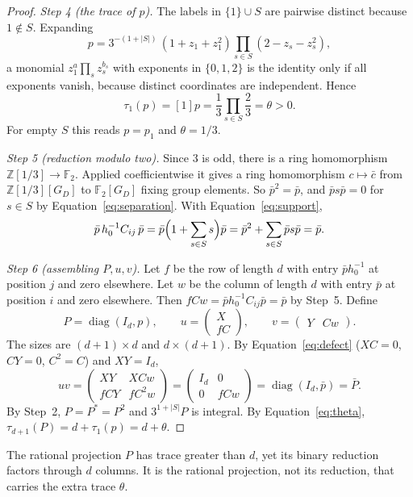 \documentclass[11pt]{article}
\theoremstyle{remark}
\numberwithin{equation}{section}
\newcommand{\F}{\mathbb F}
\newcommand{\Z}{\mathbb Z}
\newcommand{\diag}{\operatorname{diag}}
\begin{document}
\begin{proof}
\emph{Step 4 (the trace of $p$).} The labels in $\{1\}\cup S$ are pairwise distinct because $1\notin S$. Expanding
\[
 p=3^{-(1+|S|)}\,(1+z_1+z_1^2)\prod_{s\in S}(2-z_s-z_s^2),
\]
a monomial $z_1^{a}\prod_sz_s^{b_s}$ with exponents in $\{0,1,2\}$ is the identity only if all exponents vanish, because distinct coordinates are independent. Hence
\begin{equation}\label{eq:theta}
 \tau_1(p)=[1]p=\frac13\prod_{s\in S}\frac23=\theta>0.
\end{equation}
For empty $S$ this reads $p=p_1$ and $\theta=1/3$.

\emph{Step 5 (reduction modulo two).} Since $3$ is odd, there is a ring homomorphism $\Z[1/3]\to\F_2$. Applied coefficientwise it gives a ring homomorphism $c\mapsto\bar c$ from $\Z[1/3][G_D]$ to $\F_2[G_D]$ fixing group elements. So $\bar p^2=\bar p$, and $\bar ps\bar p=0$ for $s\in S$ by Equation~\eqref{eq:separation}. With Equation~\eqref{eq:support},
\[
 \bar p\,h_0^{-1}C_{ij}\,\bar p
 =\bar p\Bigl(1+\sum_{s\in S}s\Bigr)\bar p=\bar p^2+\sum_{s\in S}\bar ps\bar p=\bar p.
\]

\emph{Step 6 (assembling $P,u,v$).} Let $f$ be the row of length $d$ with entry $\bar ph_0^{-1}$ at position $j$ and zero elsewhere. Let $w$ be the column of length $d$ with entry $\bar p$ at position $i$ and zero elsewhere. Then $fCw=\bar ph_0^{-1}C_{ij}\bar p=\bar p$ by Step~5. Define
\[
 P=\diag(I_d,p),\qquad
 u=\begin{pmatrix}X\\fC\end{pmatrix},\qquad
 v=\begin{pmatrix}Y&Cw\end{pmatrix}.
\]
The sizes are $(d+1)\times d$ and $d\times(d+1)$. By Equation~\eqref{eq:defect} ($XC=0$, $CY=0$, $C^2=C$) and $XY=I_d$,
\[
 uv=\begin{pmatrix}XY&XCw\\fCY&fC^2w\end{pmatrix}
   =\begin{pmatrix}I_d&0\\0&fCw\end{pmatrix}
   =\diag(I_d,\bar p)=\bar P.
\]
By Step~2, $P=P^*=P^2$ and $3^{1+|S|}P$ is integral. By Equation~\eqref{eq:theta}, $\tau_{d+1}(P)=d+\tau_1(p)=d+\theta$.
\end{proof}

The rational projection $P$ has trace greater than $d$, yet its binary reduction factors through $d$ columns. It is the rational projection, not its reduction, that carries the extra trace $\theta$.
\end{document}
